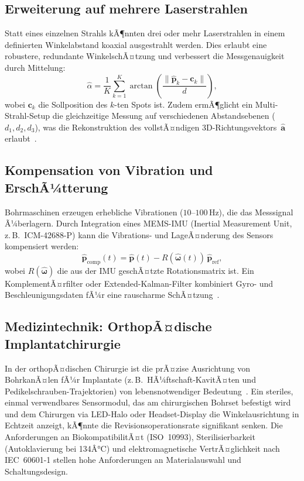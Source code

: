 ﻿\documentclass[a4paper,12pt]{article}
\theoremstyle{definition}
\begin{document}
\subsection{Erweiterung auf mehrere Laserstrahlen}

Statt eines einzelnen Strahls kÃ¶nnten drei oder mehr Laserstrahlen in einem
definierten Winkelabstand koaxial ausgestrahlt werden.
Dies erlaubt eine robustere, redundante WinkelschÃ¤tzung und verbessert die
Messgenauigkeit durch Mittelung:
\[
  \hat{\alpha} = \frac{1}{K}\sum_{k=1}^{K} \arctan\!\left(\frac{\|\hat{\mathbf{p}}_k - \mathbf{c}_k\|}{d}\right),
\]
wobei $\mathbf{c}_k$ die Sollposition des $k$-ten Spots ist.
Zudem ermÃ¶glicht ein Multi-Strahl-Setup die gleichzeitige Messung auf
verschiedenen Abstandsebenen ($d_1, d_2, d_3$), was die Rekonstruktion
des vollstÃ¤ndigen 3D-Richtungsvektors~$\hat{\mathbf{a}}$ erlaubt~\cite{luxbacher2020multi}.

\subsection{Kompensation von Vibration und ErschÃ¼tterung}

Bohrmaschinen erzeugen erhebliche Vibrationen ($10$--$100\,\mathrm{Hz}$),
die das Messsignal Ã¼berlagern. Durch Integration eines MEMS-IMU
(Inertial Measurement Unit, z.\,B.\ ICM-42688-P) kann die Vibrations-
und LageÃ¤nderung des Sensors kompensiert werden:
\[
  \hat{\mathbf{p}}_{\mathrm{comp}}(t) = \hat{\mathbf{p}}(t)
    - R(\hat{\boldsymbol{\omega}}(t))\, \hat{\mathbf{p}}_{\mathrm{ref}},
\]
wobei $R(\hat{\boldsymbol{\omega}})$ die aus der IMU geschÃ¤tzte Rotationsmatrix ist.
Ein KomplementÃ¤rfilter oder Extended-Kalman-Filter kombiniert Gyro- und
Beschleunigungsdaten fÃ¼r eine rauscharme SchÃ¤tzung~\cite{madgwick2010efficient}.

\subsection{Medizintechnik: OrthopÃ¤dische Implantatchirurgie}

In der orthopÃ¤dischen Chirurgie ist die prÃ¤zise Ausrichtung von BohrkanÃ¤len
fÃ¼r Implantate (z.\,B.\ HÃ¼ftschaft-KavitÃ¤ten und Pedikelschrauben-Trajektorien)
von lebensnotwendiger Bedeutung~\cite{liebergall2009image}.
Ein steriles, einmal verwendbares Sensormodul, das am chirurgischen Bohrset
befestigt wird und dem Chirurgen via LED-Halo oder Headset-Display die
Winkelausrichtung in Echtzeit anzeigt, kÃ¶nnte die Revisions\-operations\-rate
signifikant senken.
Die Anforderungen an BiokompatibilitÃ¤t (ISO~10993), Sterilisierbarkeit
(Autoklavierung bei 134Â°C) und elektromagnetische VertrÃ¤glichkeit nach
IEC~60601-1 stellen hohe Anforderungen an Materialauswahl und Schaltungsdesign.
\end{document}
